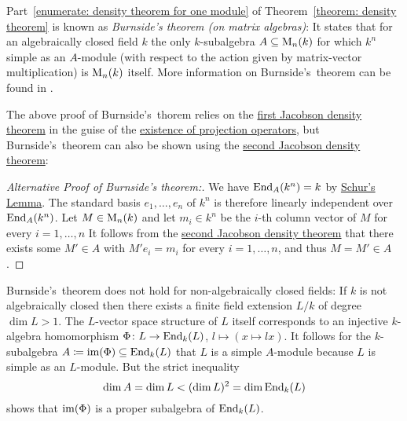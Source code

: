 


\begin{remark}
  Part~\ref*{enumerate: density theorem for one module} of Theorem~\ref{theorem: density theorem} is known as \emph{Burnside’s theorem \textup(on matrix algebras\textup)}:
  It states that for an algebraically closed field $k$ the only $k$-subalgebra $A \subseteq \operatorname{M}_n(k)$ for which $k^n$ simple as an $A$-module (with respect to the action given by matrix-vector multiplication) is $\operatorname{M}_n(k)$ itself.
  More information on Burnside’s~theorem can be found in \cite{ShapiroBurnside}.
  
  The above proof of Burnside’s~thorem  relies on the \hyperref[theorem: first jacobson density theorem]{first Jacobson density theorem} in the guise of the \hyperref[corollary: existence of projection operators]{existence of projection operators}, but Burnside’s~theorem can also be shown using the \hyperref[theorem: second jacobson density theorem]{second Jacobson density theorem}:
\end{remark}


\begin{proof}[Alternative Proof of Burnside’s theorem:]
  We have $\operatorname{End}_A(k^n) = k$ by \hyperref[proposition: schurs lemma for modules]{Schur’s Lemma}.
  The standard basis $e_1, \dotsc, e_n$ of $k^n$ is therefore linearly independent over $\operatorname{End}_A(k^n)$.
  Let $M \in \operatorname{M}_n(k)$ and let $m_i \in k^n$ be the $i$-th column vector of $M$ for every $i = 1, \dotsc, n$
  It follows from the \hyperref[theorem: second jacobson density theorem]{second Jacobson density theorem} that there exists some $M' \in A$ with $M' e_i = m_i$ for every $i = 1, \dotsc, n$, and thus $M = M' \in A$.
\end{proof}


\begin{remark}
  Burnside’s~theorem does not hold for non-algebraically closed fields:
  If $k$ is not algebraically closed then there exists a finite field extension $L/k$ of degree $\dim L > 1$.
  The $L$-vector space structure of $L$ itself corresponds to an injective $k$-algebra homomorphism $\Phi \colon L \to \operatorname{End}_k(L)$, $l \mapsto (x \mapsto lx)$.
  It follows for the $k$-subalgebra $A \coloneqq \operatorname{im}(\Phi) \subseteq \operatorname{End}_k(L)$ that $L$ is a simple $A$-module because $L$ is simple as an $L$-module.
  But the strict inequality
  \[
      \dim A
    = \dim L
    < (\dim L)^2
    = \dim \operatorname{End}_k(L)
  \]
  shows that $\operatorname{im}(\Phi)$ is a proper subalgebra of $\operatorname{End}_k(L)$.
\end{remark}


